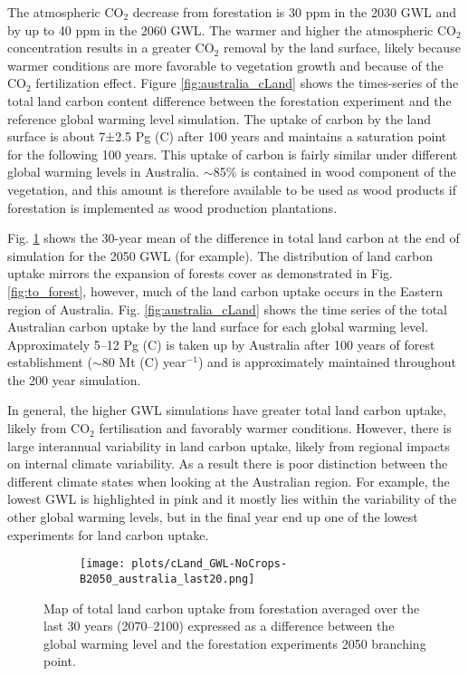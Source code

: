 \documentclass[]{article}
\begin{document}
The atmospheric CO$_2$ decrease from forestation is 30 ppm in the 2030 GWL and by up to 40 ppm in the 2060 GWL.
The warmer and higher the atmospheric CO$_2$ concentration results in a greater CO$_2$ removal by the land surface, likely because warmer conditions are more favorable to vegetation growth and because of the CO$_2$ fertilization effect.
Figure \ref{fig:australia_cLand} shows the times-series of the total land carbon content difference between the forestation experiment and the reference global warming level simulation.
The uptake of carbon by the land surface is about 7±2.5 Pg (C) after 100 years and maintains a saturation point for the following 100 years.
This uptake of carbon is fairly similar under different global warming levels in Australia.
$\sim$85\% is contained in wood component of the vegetation, and this amount is therefore available to be used as wood products if forestation is implemented as wood production plantations.

Fig. \ref{fig:aus_map_cLand} shows the 30-year mean of the difference in total land carbon at the end of simulation for the 2050 GWL (for example).
The distribution of land carbon uptake mirrors the expansion of forests cover as demonstrated in Fig. \ref{fig:to_forest}, however, much of the land carbon uptake occurs in the Eastern region of Australia.
Fig. \ref{fig:australia_cLand} shows the time series of the total Australian carbon uptake by the land surface for each global warming level.
Approximately 5--12 Pg (C) is taken up by Australia after 100 years of forest establishment ($\sim$80 Mt (C) year$^{-1}$) and is approximately maintained throughout the 200 year simulation.

In general, the higher GWL simulations have greater total land carbon uptake, likely from CO$_2$ fertilisation and favorably warmer conditions.
However, there is large interannual variability in land carbon uptake, likely from regional impacts on internal climate variability.
As a result there is poor distinction between the different climate states when looking at the Australian region.
For example, the lowest GWL is highlighted in pink and it mostly lies within the variability of the other global warming levels, but in the final year end up one of the lowest experiments for land carbon uptake.

\begin{figure}[H]
    \centering
    \begin{subfigure}[b]{\linewidth}
        \texttt{[image: plots/cLand\_GWL-NoCrops-B2050\_australia\_last20.png]}
    \end{subfigure}
    \caption{Map of total land carbon uptake from forestation averaged over the last 30 years (2070--2100) expressed as a difference between the global warming level and the forestation experiments 2050 branching point.}
    \label{fig:aus_map_cLand}
\end{figure}
\end{document}
